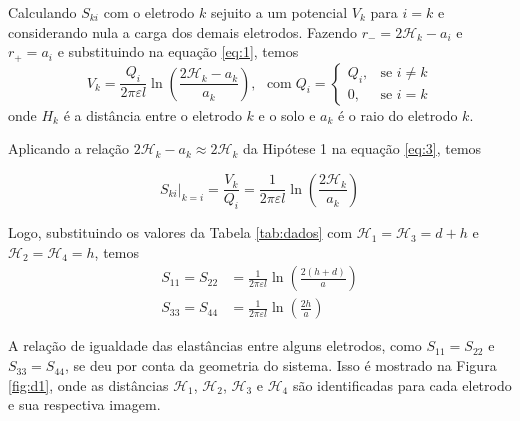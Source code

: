 \documentclass{aleph-revista}
\begin{document}
Calculando $S_{ki}$ com o eletrodo $k$ sejuito a um potencial $V_k$ para $i=k$ e considerando nula a carga dos demais eletrodos. Fazendo $r_- = 2\mathcal{H}_k - a_i$ e $r_+ = a_i$ e substituindo na equação \eqref{eq:1}, temos
\begin{equation}\label{eq:3}
  V_k = \frac{Q_i}{2\pi\varepsilon l}\ln\left(\frac{2\mathcal{H}_k - a_k}{a_k}\right) \text{,} \;\;\; \text{com} \; Q_i =
  \begin{cases}
    Q_i, & \text{se } i \neq k \\
    0,   & \text{se } i = k
  \end{cases}
\end{equation}
onde $H_k$ é a distância entre o eletrodo $k$ e o solo e $a_k$ é o raio do eletrodo $k$.

Aplicando a relação $2\mathcal{H}_k-a_k \approx 2\mathcal{H}_k$ da Hipótese 1 na equação \eqref{eq:3}, temos

\begin{equation}\label{eq:4}
  \left. S_{ki} \right|_{k=i} = \frac{V_k}{Q_i} = \frac{1}{2\pi\varepsilon l}\ln\left(\frac{2\mathcal{H}_k}{a_k}\right)
\end{equation}

Logo, substituindo os valores da Tabela \ref{tab:dados} com $\mathcal{H}_1 = \mathcal{H}_3 = d+h$ e $\mathcal{H}_2 = \mathcal{H}_4 = h$, temos
\begin{align}
  S_{11} = S_{22} & = \frac{1}{2\pi\varepsilon l}\ln\left(\frac{2(h+d)}{a}\right)\label{eq:5} \\[1em]
  S_{33} = S_{44} & = \frac{1}{2\pi\varepsilon l}\ln\left(\frac{2h}{a}\right)\label{eq:6}
\end{align}

A relação de igualdade das elastâncias entre alguns eletrodos, como $S_{11} = S_{22}$ e $S_{33} = S_{44}$, se deu por conta da geometria do sistema. Isso é mostrado na Figura \ref{fig:d1}, onde as distâncias $\mathcal{H}_1$, $\mathcal{H}_2$, $\mathcal{H}_3$ e $\mathcal{H}_4$ são identificadas para cada eletrodo e sua respectiva imagem.
\end{document}
